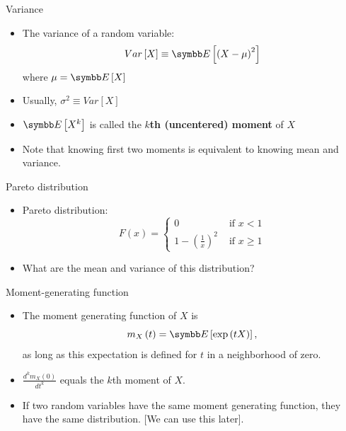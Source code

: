 \documentclass[aspectratio=169,11pt]{beamer}
\begin{document}
\begin{frame}{Variance}
\begin{itemize}
	\item The variance of a random variable:\[
		Var \left[X\right] \equiv \E\left[\left(X-\mu\right)^2\right]
	\]
	where $\mu=\E\left[X\right]$
	
	\bigskip
	\item Usually, $\sigma^2 \equiv Var \left[X\right] $


	\bigskip
	\item $\E\left[X^k\right]$ is called the {\bf $k$th (uncentered) moment} of $X$
	
	\bigskip
	\item Note that knowing first two moments is equivalent to knowing mean and variance. 
	
\end{itemize}
\end{frame}


\begin{frame}{Pareto distribution}
\begin{itemize}
	\item Pareto distribution:\[
	F\left(x\right)=\begin{cases}
	0 & \text{ if }x<1\\
	1-\left(\frac{1}{x}\right)^{2} & \text{ if }x\ge1
	\end{cases}
	\]

	\medskip
	\item What are the mean and variance of this distribution?
	
\end{itemize}
\end{frame}



\begin{frame}{Moment-generating function}
\begin{itemize}
	\item The moment generating function of $X$ is \[
		m_X \left(t\right) = \E\left[\exp\left(tX\right)\right],
	\]	
	as long as this expectation is defined for $t$ in a neighborhood of zero. 
	
	\medskip 
	\item $\frac{d^k m_X \left(0\right) }{dt^k}$ equals the $k$th moment of $X$.

	\medskip
	\item If two random variables have the same moment generating function, they have the same distribution. [We can use this later].
\end{itemize}
\end{frame}
\end{document}
